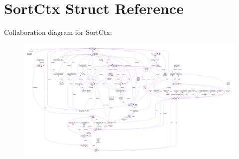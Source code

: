 \hypertarget{structSortCtx}{}\section{Sort\+Ctx Struct Reference}
\label{structSortCtx}


Collaboration diagram for Sort\+Ctx\+:\nopagebreak
\begin{figure}[H]
\begin{center}
\leavevmode
\includegraphics[width=350pt]{structSortCtx__coll__graph}
\end{center}
\end{figure}

